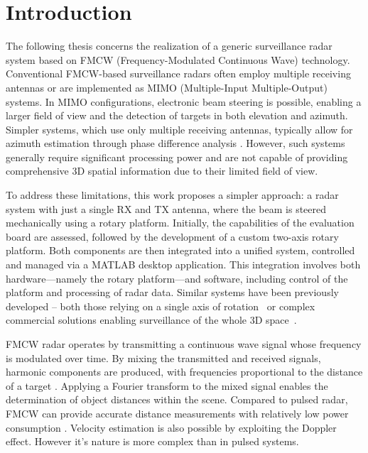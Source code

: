 
\chapter*{Introduction}

The following thesis concerns the realization of a generic surveillance radar system based on FMCW (Frequency-Modulated Continuous Wave) technology.
Conventional FMCW-based surveillance radars often employ multiple receiving antennas or are implemented as MIMO (Multiple-Input Multiple-Output) systems.
In MIMO configurations, electronic beam steering is possible, enabling a larger field of view and the detection of targets in both elevation and azimuth.
Simpler systems, which use only multiple receiving antennas, typically allow for azimuth estimation through phase difference analysis \cite{sandeep2018}.
However, such systems generally require significant processing power and are not capable of providing comprehensive 3D spatial information due to their limited field of view.

To address these limitations, this work proposes a simpler approach: a radar system with just a single RX and TX antenna, where the beam is steered mechanically using a rotary platform.
Initially, the capabilities of the \sirad evaluation board are assessed, followed by the development of a custom two-axis rotary platform.
Both components are then integrated into a unified system, controlled and managed via a MATLAB desktop application.
This integration involves both hardware—namely the rotary platform—and software, including control of the platform and processing of radar data.
Similar systems have been previously developed -- both those relying on a single axis of rotation~\cite{nowok2017, vivet2013} or complex commercial solutions enabling surveillance of the whole 3D space~\cite{blighter}.

FMCW radar operates by transmitting a continuous wave signal whose frequency is modulated over time.
By mixing the transmitted and received signals, harmonic components are produced, with frequencies proportional to the distance of a target \cite{graham2005}.
Applying a Fourier transform to the mixed signal enables the determination of object distances within the scene.
Compared to pulsed radar, FMCW can provide accurate distance measurements with relatively low power consumption \cite{jankiraman2018}.
Velocity estimation is also possible by exploiting the Doppler effect.
However it's nature is more complex than in pulsed systems.


